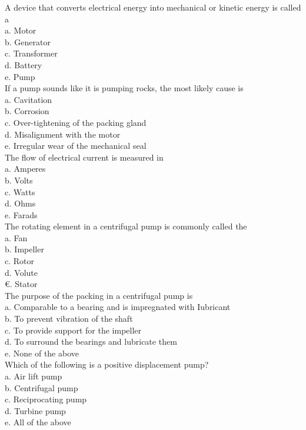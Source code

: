 A device that converts electrical energy into mechanical or kinetic energy is called a\\
a. Motor\\
b. Generator\\
c. Transformer\\
d. Battery\\
e. Pump\\

If a pump sounds like it is pumping rocks, the most likely cause is\\
a. Cavitation\\
b. Corrosion\\
c. Over-tightening of the packing gland\\
d. Misalignment with the motor\\
e. Irregular wear of the mechanical seal\\

The flow of electrical current is measured in\\
a. Amperes\\
b. Volts\\
c. Watts\\
d. Ohms\\
e. Farads\\

The rotating element in a centrifugal pump is commonly called the\\
a. Fan\\
b. Impeller\\
c. Rotor\\
d. Volute\\
€. Stator\\

The purpose of the packing in a centrifugal pump is\\
a. Comparable to a bearing and is impregnated with Iubricant\\
b. To prevent vibration of the shaft\\
c. To provide support for the impeller\\
d. To surround the bearings and lubricate them\\
e. None of the above\\

Which of the following is a positive displacement pump?\\
a. Air lift pump\\
b. Centrifugal pump\\
c. Reciprocating pump\\
d. Turbine pump\\
e. All of the above

